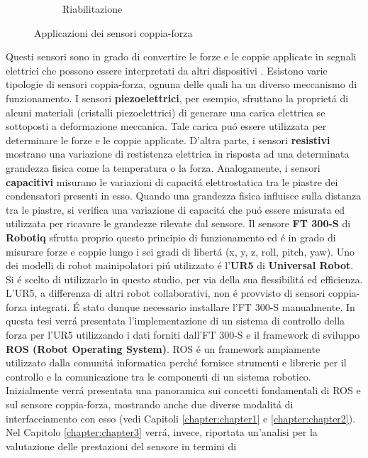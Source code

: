\begin{figure}[H]
\begin{subfigure}[b]{0.33\textwidth}
        \caption{Riabilitazione}
        \label{fig:rehab}
    \end{subfigure}
    \caption{Applicazioni dei sensori coppia-forza}\label{fig:industrial_applications}
\end{figure}
Questi sensori sono in grado di convertire le forze e le coppie applicate in segnali elettrici che possono essere 
interpretati da altri dispositivi \cite{cao2021six}. 
Esistono varie tipologie di sensori coppia-forza, ognuna delle quali ha un diverso meccanismo di funzionamento. 
I sensori \textbf{piezoelettrici}, per esempio, sfruttano la propriet\'{a} di alcuni materiali (cristalli piezoelettrici) di generare 
una carica elettrica se sottoposti a deformazione meccanica. Tale carica pu\'{o} essere utilizzata per determinare le forze e le coppie 
applicate. 
D'altra parte, i sensori \textbf{resistivi} mostrano una variazione di restistenza elettrica in risposta ad 
una determinata grandezza fisica come la temperatura o la forza.
Analogamente, i sensori \textbf{capacitivi} misurano le variazioni di capacit\'{a} elettrostatica tra le piastre dei condensatori 
presenti in esso. Quando una grandezza fisica influisce sulla distanza tra le piastre, si verifica una variazione di capacit\'{a} 
che pu\'{o} essere misurata ed utilizzata per ricavare le grandezze rilevate dal sensore.
Il sensore \textbf{FT 300-S} di \textbf{Robotiq} sfrutta proprio questo principio di funzionamento ed \'{e} in grado di misurare 
forze e coppie lungo i sei gradi di libert\'{a} (x, y, z, roll, pitch, yaw). 
Uno dei modelli di robot mainipolatori pi\'{u} utilizzato \'{e} l'\textbf{UR5} di \textbf{Universal Robot}. Si \'{e} scelto di 
utilizzarlo in questo studio, per via della sua flessibilit\'{a} ed efficienza. 
L'UR5, a differenza di altri robot collaborativi, non \'{e} provvisto di sensori coppia-forza integrati. \'{E} stato dunque necessario 
installare l'FT 300-S manualmente. 
In questa tesi verr\'{a} presentata l'implementazione di un sistema di controllo della forza per l'UR5 utilizzando i dati
forniti dall'FT 300-S e il framework di sviluppo \textbf{ROS (Robot Operating System)}.
ROS \'{e} un framework ampiamente utilizzato dalla comunit\'{a} informatica perch\'{e} fornisce strumenti e librerie 
per il controllo e la comunicazione tra le componenti di un sistema robotico. 
Inizialmente verr\'{a} presentata una panoramica 
sui concetti fondamentali di ROS e sul sensore coppia-forza, mostrando anche due diverse modalit\'{a} di interfacciamento con esso 
(vedi Capitoli \ref{chapter:chapter1} e \ref{chapter:chapter2}).
Nel Capitolo \ref{chapter:chapter3} verr\'{a}, invece, riportata un'analisi per la valutazione delle prestazioni del sensore in termini di 
